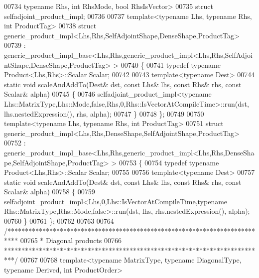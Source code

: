 \begin{DoxyCode}
00734           \textcolor{keyword}{typename} Rhs, \textcolor{keywordtype}{int} RhsMode, \textcolor{keywordtype}{bool} RhsIsVector>
00735 \textcolor{keyword}{struct }selfadjoint\_product\_impl;
00736 
00737 \textcolor{keyword}{template}<\textcolor{keyword}{typename} Lhs, \textcolor{keyword}{typename} Rhs, \textcolor{keywordtype}{int} ProductTag>
00738 \textcolor{keyword}{struct }generic\_product\_impl<Lhs,Rhs,SelfAdjointShape,DenseShape,ProductTag>
00739   : generic\_product\_impl\_base<Lhs,Rhs,generic\_product\_impl<Lhs,Rhs,SelfAdjointShape,DenseShape,ProductTag> 
      >
00740 \{
00741   \textcolor{keyword}{typedef} \textcolor{keyword}{typename} Product<Lhs,Rhs>::Scalar Scalar;
00742   
00743   \textcolor{keyword}{template}<\textcolor{keyword}{typename} Dest>
00744   \textcolor{keyword}{static} \textcolor{keywordtype}{void} scaleAndAddTo(Dest& dst, \textcolor{keyword}{const} Lhs& lhs, \textcolor{keyword}{const} Rhs& rhs, \textcolor{keyword}{const} Scalar& alpha)
00745   \{
00746     selfadjoint\_product\_impl<typename
       Lhs::MatrixType,Lhs::Mode,false,Rhs,0,Rhs::IsVectorAtCompileTime>::run(dst, lhs.nestedExpression(), rhs, alpha);
00747   \}
00748 \};
00749 
00750 \textcolor{keyword}{template}<\textcolor{keyword}{typename} Lhs, \textcolor{keyword}{typename} Rhs, \textcolor{keywordtype}{int} ProductTag>
00751 \textcolor{keyword}{struct }generic\_product\_impl<Lhs,Rhs,DenseShape,SelfAdjointShape,ProductTag>
00752 : generic\_product\_impl\_base<Lhs,Rhs,generic\_product\_impl<Lhs,Rhs,DenseShape,SelfAdjointShape,ProductTag> >
00753 \{
00754   \textcolor{keyword}{typedef} \textcolor{keyword}{typename} Product<Lhs,Rhs>::Scalar Scalar;
00755   
00756   \textcolor{keyword}{template}<\textcolor{keyword}{typename} Dest>
00757   \textcolor{keyword}{static} \textcolor{keywordtype}{void} scaleAndAddTo(Dest& dst, \textcolor{keyword}{const} Lhs& lhs, \textcolor{keyword}{const} Rhs& rhs, \textcolor{keyword}{const} Scalar& alpha)
00758   \{
00759     selfadjoint\_product\_impl<Lhs,0,Lhs::IsVectorAtCompileTime,typename
       Rhs::MatrixType,Rhs::Mode,false>::run(dst, lhs, rhs.nestedExpression(), alpha);
00760   \}
00761 \};
00762 
00763 
00764 \textcolor{comment}{/***************************************************************************}
00765 \textcolor{comment}{* Diagonal products}
00766 \textcolor{comment}{***************************************************************************/}
00767   
00768 \textcolor{keyword}{template}<\textcolor{keyword}{typename} MatrixType, \textcolor{keyword}{typename} DiagonalType, \textcolor{keyword}{typename} Derived, \textcolor{keywordtype}{int} ProductOrder>

\end{DoxyCode}
